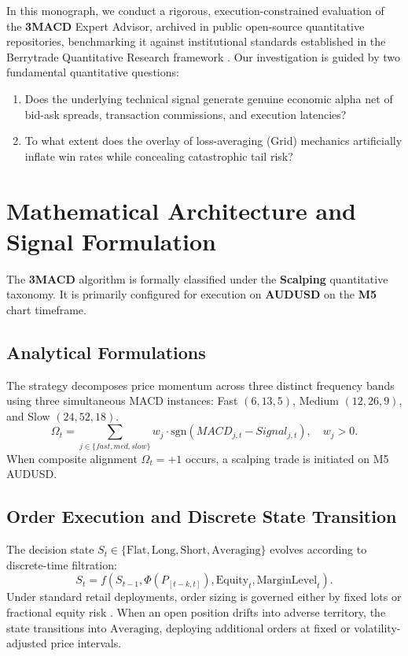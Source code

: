 \documentclass[11pt,a4paper]{article}
\begin{document}
In this monograph, we conduct a rigorous, execution-constrained evaluation of the \textbf{3MACD} Expert Advisor, archived in public open-source quantitative repositories, benchmarking it against institutional standards established in the Berrytrade Quantitative Research framework \cite{artsu2026illusion}. Our investigation is guided by two fundamental quantitative questions:
\begin{enumerate}
    \item Does the underlying technical signal generate genuine economic alpha net of bid-ask spreads, transaction commissions, and execution latencies?
    \item To what extent does the overlay of loss-averaging (Grid) mechanics artificially inflate win rates while concealing catastrophic tail risk?
\end{enumerate}

\section{Mathematical Architecture and Signal Formulation}
The \textbf{3MACD} algorithm is formally classified under the \textbf{Scalping} quantitative taxonomy. It is primarily configured for execution on \textbf{AUDUSD} on the \textbf{M5} chart timeframe.

\subsection{Analytical Formulations}

The strategy decomposes price momentum across three distinct frequency bands using three simultaneous MACD instances: Fast $(6, 13, 5)$, Medium $(12, 26, 9)$, and Slow $(24, 52, 18)$.
\begin{equation}
\Omega_t = \sum_{j \in \{fast, med, slow\}} w_j \cdot \text{sgn}(MACD_{j, t} - Signal_{j, t}), \quad w_j > 0.
\end{equation}
When composite alignment $\Omega_t = +1$ occurs, a scalping trade is initiated on M5 AUDUSD.


\subsection{Order Execution and Discrete State Transition}
The decision state $S_t \in \{\text{Flat}, \text{Long}, \text{Short}, \text{Averaging}\}$ evolves according to discrete-time filtration:
\begin{equation}
S_{t} = f(S_{t-1}, \Phi(P_{[t-k, t]}), \text{Equity}_t, \text{MarginLevel}_t).
\end{equation}
Under standard retail deployments, order sizing is governed either by fixed lots or fractional equity risk \cite{lopez2018advances, carhart1997persistence}. When an open position drifts into adverse territory, the state transitions into $\text{Averaging}$, deploying additional orders at fixed or volatility-adjusted price intervals.
\end{document}
